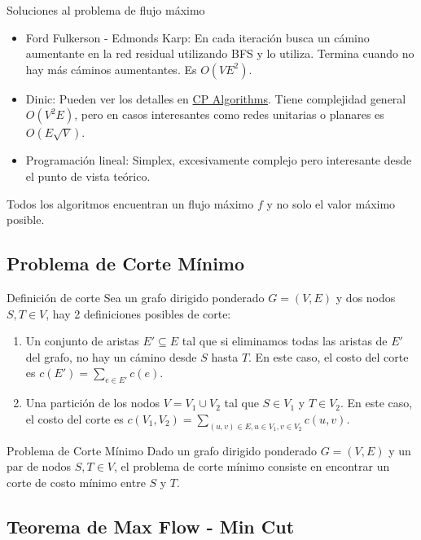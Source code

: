 \documentclass{beamer}
\begin{document}
\begin{frame}{Soluciones al problema de flujo máximo}
    \begin{itemize}
        \item Ford Fulkerson - Edmonds Karp: En cada iteración busca un cámino aumentante en la red residual utilizando BFS y lo utiliza. Termina cuando no hay más cáminos aumentantes. Es $O(VE^2)$.
        \item Dinic: Pueden ver los detalles en \href{https://cp-algorithms.com/graph/dinic.html}{CP Algorithms}. Tiene complejidad general $O(V^2E)$, pero en casos interesantes como redes unitarias o planares es $O(E\sqrt{V})$.
        \item Programación lineal: Simplex, excesivamente complejo pero interesante desde el punto de vista teórico.
    \end{itemize}

    Todos los algoritmos encuentran un flujo máximo $f$ y no solo el valor máximo posible.
\end{frame}

\subsection{Problema de Corte Mínimo}
\begin{frame}{Definición de corte}
    Sea un grafo dirigido ponderado $G = (V, E)$ y dos nodos $S, T \in V$, hay 2 definiciones posibles de corte:
    \begin{enumerate}
        \item Un conjunto de aristas $E' \subseteq E$ tal que si eliminamos todas las aristas de $E'$ del grafo, no hay un cámino desde $S$ hasta $T$. En este caso, el costo del corte es $c(E') = \sum_{e \in E'} c(e)$.
        \item Una partición de los nodos $V = V_1 \cup V_2$ tal que $S \in V_1$ y $T \in V_2$. En este caso, el costo del corte es $c(V_1, V_2) = \sum_{(u,v) \in E, u \in V_1, v \in V_2} c(u,v)$.
    \end{enumerate}
\end{frame}

\begin{frame}{Problema de Corte Mínimo}
    Dado un grafo dirigido ponderado $G = (V,E)$ y un par de nodos $S, T \in V$, el problema de corte mínimo consiste en encontrar un corte de costo mínimo entre $S$ y $T$.    
\end{frame}

\subsection{Teorema de Max Flow - Min Cut}
\end{document}
